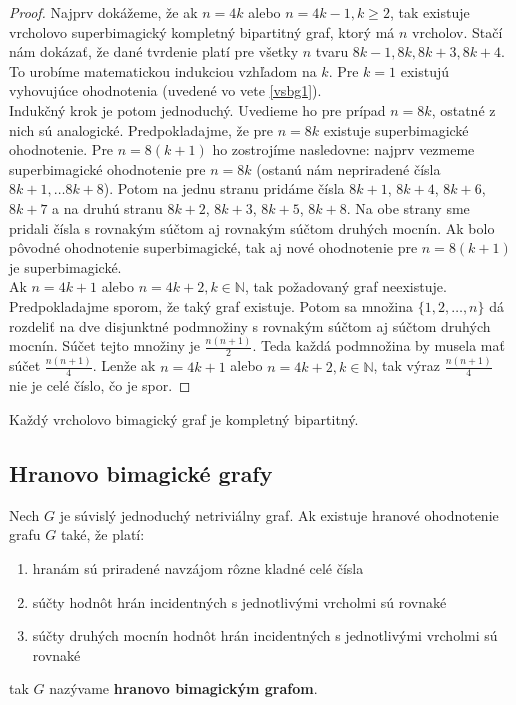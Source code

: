 \begin{proof} Najprv dokážeme, že ak $n = 4k$ alebo $n = 4k-1, k \geq 2$, tak existuje vrcholovo superbimagický kompletný bipartitný graf, ktorý má $n$ vrcholov. Stačí nám dokázať, že dané tvrdenie platí pre všetky $n$ tvaru $8k-1, 8k, 8k+3, 8k+4$. To urobíme matematickou indukciou vzhľadom na $k$. Pre $k = 1$ existujú vyhovujúce ohodnotenia (uvedené vo vete \ref{vsbg1}). \\

Indukčný krok je potom jednoduchý. Uvedieme ho pre prípad $n = 8k$, ostatné z nich sú analogické. Predpokladajme, že pre $n = 8k$ existuje superbimagické ohodnotenie. Pre $n = 8(k+1)$ ho zostrojíme nasledovne: najprv vezmeme superbimagické ohodnotenie pre $n = 8k$ (ostanú nám nepriradené čísla $8k+1, \dots 8k+8$). Potom na jednu stranu pridáme čísla $8k+1$, $8k+4$, $8k+6$, $8k+7$ a na druhú stranu $8k+2$, $8k+3$, $8k+5$, $8k+8$. Na obe strany sme pridali čísla s rovnakým súčtom aj rovnakým súčtom druhých mocnín. Ak bolo pôvodné ohodnotenie superbimagické, tak aj nové ohodnotenie pre $n = 8(k+1)$ je superbimagické. \\

Ak $n = 4k+1$ alebo $n = 4k+2, k \in \mathbb{N}$, tak požadovaný graf neexistuje. Predpokladajme sporom, že taký graf existuje. Potom sa množina $\{1, 2, \dots , n\}$ dá rozdeliť na dve disjunktné podmnožiny s rovnakým súčtom aj súčtom druhých mocnín. Súčet tejto množiny je $\frac{n(n+1)}{2}$. Teda každá podmnožina by musela mať súčet $\frac{n(n+1)}{4}$. Lenže ak $n = 4k+1$ alebo $n = 4k+2, k \in \mathbb{N}$, tak výraz $\frac{n(n+1)}{4}$ nie je celé číslo, čo je spor.
\end{proof}

\begin{hypothesis} Každý vrcholovo bimagický graf je kompletný bipartitný.
\end{hypothesis}



\subsection{Hranovo bimagické grafy}

\begin{definition} Nech $G$ je súvislý jednoduchý netriviálny graf. Ak existuje hranové ohodnotenie grafu $G$ také, že platí:

\begin{enumerate}
\item hranám sú priradené navzájom rôzne kladné celé čísla
\item súčty hodnôt hrán incidentných s jednotlivými vrcholmi sú rovnaké
\item súčty druhých mocnín hodnôt hrán incidentných s jednotlivými vrcholmi sú rovnaké
\end{enumerate}

tak $G$ nazývame \textbf{hranovo bimagickým grafom}.
\end{definition} 

